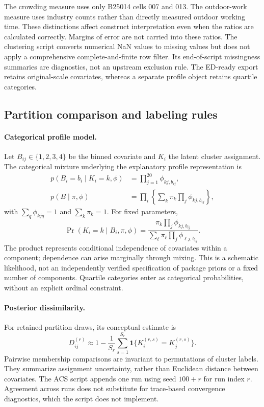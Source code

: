 \documentclass[11pt,letterpaper]{article}
\newcommand{\Prob}{\operatorname{Pr}}
\begin{document}
The crowding measure uses only B25014 cells 007 and 013. The outdoor-work measure uses industry counts rather than directly measured outdoor working time. These distinctions affect construct interpretation even when the ratios are calculated correctly. Margins of error are not carried into these ratios. The clustering script converts numerical NaN values to missing values but does not apply a comprehensive complete-and-finite row filter. Its end-of-script missingness summaries are diagnostics, not an upstream exclusion rule. The ED-ready export retains original-scale covariates, whereas a separate profile object retains quartile categories.

\subsection{Partition comparison and labeling rules}
\label{supp:partition}
\paragraph{Categorical profile model.}
Let \(B_{ij}\in\{1,2,3,4\}\) be the binned covariate and \(K_i\) the latent cluster assignment. The categorical mixture underlying the explanatory profile representation is
\begin{align}
 p(B_i=b_i\mid K_i=k,\phi)&=\prod_{j=1}^{20}\phi_{kj,b_{ij}},\\
 p(B\mid\pi,\phi)&=\prod_i\left\{\sum_k\pi_k\prod_j\phi_{kj,b_{ij}}\right\},
\end{align}
with \(\sum_q\phi_{kjq}=1\) and \(\sum_k\pi_k=1\). For fixed parameters,
\begin{equation}
 \Prob(K_i=k\mid B_i,\pi,\phi)=
 \frac{\pi_k\prod_j\phi_{kj,b_{ij}}}{\sum_\ell\pi_\ell\prod_j\phi_{\ell j,b_{ij}}}.
\end{equation}
The product represents conditional independence of covariates within a component; dependence can arise marginally through mixing. This is a schematic likelihood, not an independently verified specification of package priors or a fixed number of components. Quartile categories enter as categorical probabilities, without an explicit ordinal constraint.

\paragraph{Posterior dissimilarity.}
For retained partition draws, its conceptual estimate is
\begin{equation}
 D_{ij}^{(r)}\approx1-\frac{1}{S_r}\sum_{s=1}^{S_r}
 \mathbf 1\{K_i^{(r,s)}=K_j^{(r,s)}\}.
\end{equation}
Pairwise membership comparisons are invariant to permutations of cluster labels. They summarize assignment uncertainty, rather than Euclidean distance between covariates. The ACS script appends one run using seed \(100+r\) for run index \(r\). Agreement across runs does not substitute for trace-based convergence diagnostics, which the script does not implement.
\end{document}
